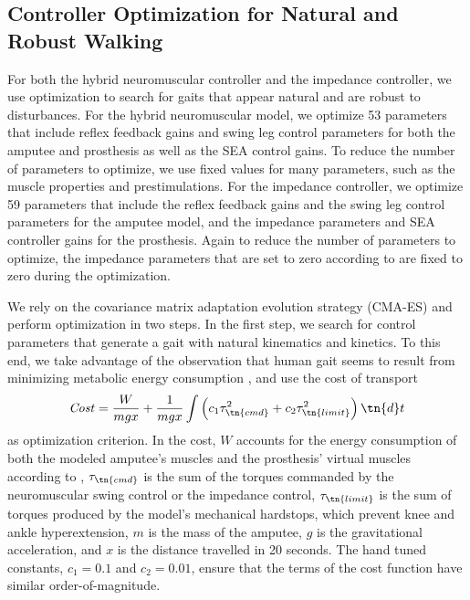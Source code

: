 \subsection{Controller Optimization for Natural and Robust Walking}
    \label{sec:completed_comparison_opt}

For both the hybrid neuromuscular controller and the impedance controller, we
use optimization to search for gaits that appear natural and are robust to
disturbances. For the hybrid neuromuscular model, we optimize 53 parameters that
include reflex feedback gains and swing leg control parameters for both the
amputee and prosthesis as well as the SEA control gains. To reduce the number of
parameters to optimize, we use fixed values for many parameters, such as the
muscle properties and prestimulations. For the impedance controller, we optimize
59 parameters that include the reflex feedback gains and the swing leg control
parameters for the amputee model, and the impedance parameters and SEA
controller gains for the prosthesis. Again to reduce the number of parameters to
optimize, the impedance parameters that are set to zero according to
\citet{sup2008design} are fixed to zero during the optimization. 

We rely on the covariance matrix adaptation evolution strategy (CMA-ES)
\citep{hansen2006cma} and perform optimization in two steps. In the first step,
we search for control parameters that generate a gait with natural kinematics
and kinetics. To this end, we take advantage of the observation that human gait
seems to result from minimizing metabolic energy consumption
\citep{mcneill2002energetics}, and use the cost of transport 
\begin{align}
    \mathit{Cost} = \frac{W}{mgx} + \frac{1}{mgx} \int \left( 
        c_1\tau_\tn{cmd}^2  + c_2 \tau_\tn{limit}^2 \right) \tn{d}t
    \label{eq:costfuncenergy}
\end{align}
as optimization criterion. In the cost, $W$ accounts for the energy consumption
of both the modeled amputee's muscles and the prosthesis' virtual muscles
according to \citet{umberger2003model}, $\tau_\tn{cmd}$ is the sum of the
torques commanded by the neuromuscular swing control or the impedance control,
$\tau_\tn{limit}$ is the sum of torques produced by the model's mechanical
hardstops, which prevent knee and ankle hyperextension, $m$ is the mass of the
amputee, $g$ is the gravitational acceleration, and $x$ is the distance
travelled in 20 seconds. The hand tuned constants, $c_1 = 0.1$ and $c_2 = 0.01$,
ensure that the terms of the cost function have similar order-of-magnitude. 

